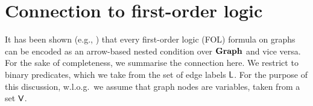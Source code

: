 \section{Connection to first-order logic}
\label{sec:FOL}

It has been shown (e.g.,  \cite{Rensink-FOL,Habel-FOL}) that every first-order logic (FOL)  formula on graphs can be encoded as an arrow-based nested condition over $\mathbf{Graph}$ and vice versa. For the sake of completeness, we summarise the connection here. We restrict to binary predicates, which we take from the set of edge labels $\mathsf{L}$. For the purpose of this discussion, w.l.o.g.\ we assume that graph nodes are variables, taken from a set $\mathsf{V}$. 

